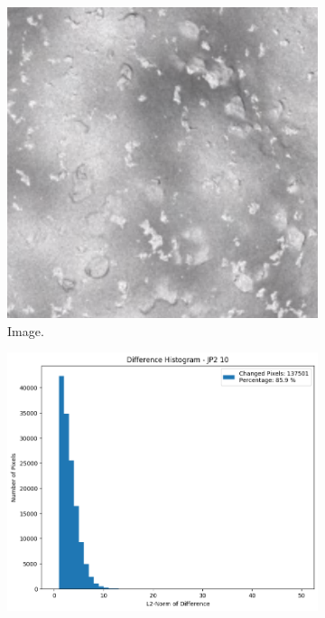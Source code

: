 \begin{figure}[htb]
    \centering
    \begin{subfigure}[b]{0.48\textwidth}
        \centering
        \includegraphics[width=\textwidth]{doc/thesis/0_figures/compare_quality/set1/jp2_10_center.png}
        \caption{Image.}
        \label{fig:img_quality_comp_jp2_10_center_orig}
    \end{subfigure}
    \begin{subfigure}[b]{0.48\textwidth}
        \centering
        \includegraphics[width=\textwidth]{doc/thesis/0_figures/compare_quality/set1/jp2_10_center_diff_histogram.png}

\end{subfigure}
\end{figure}

